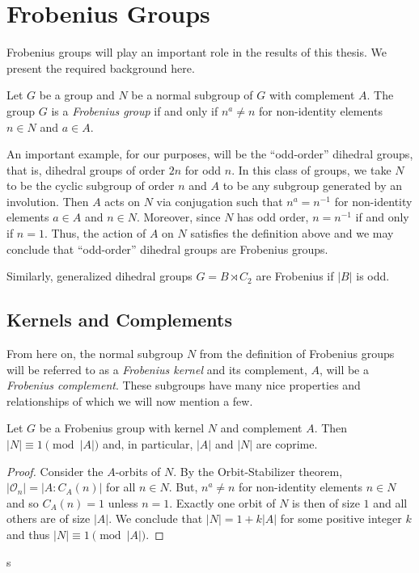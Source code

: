 \documentclass[main.tex]{subfiles}
\begin{document}
\section{Frobenius Groups}

Frobenius groups will play an important role in the results of this thesis. We present the required background here.

\hss

\begin{definition}
Let $G$ be a group and $N$ be a normal subgroup of $G$ with complement $A$. The group $G$ is a \emph{Frobenius group} if and only if $n^a \ne n$ for non-identity elements $n \in N$ and $a \in A$.
\end{definition}

\hss

An important example, for our purposes, will be the ``odd-order'' dihedral groups, that is, dihedral groups of order $2n$ for odd $n$. In this class of groups, we take $N$ to be the cyclic subgroup of order $n$ and $A$ to be any subgroup generated by an involution. Then $A$ acts on $N$ via conjugation such that $n^a = n^{-1}$ for non-identity elements $a \in A$ and $n \in N$. Moreover, since $N$ has odd order, $n = n^{-1}$ if and only if $n = 1$. Thus, the action of $A$ on $N$ satisfies the definition above and we may conclude that ``odd-order'' dihedral groups are Frobenius groups.

Similarly, generalized dihedral groups $G = B \rtimes C_2$ are Frobenius if $|B|$ is odd.

\hss

\subsection{Kernels and Complements}

\hss

From here on, the normal subgroup $N$ from the definition of Frobenius groups will be referred to as a \emph{Frobenius kernel} and its complement, $A$, will be a \emph{Frobenius complement}. These subgroups have many nice properties and relationships of which we will now mention a few.

\begin{lemma}\label{frobeniuscoprime}
Let $G$ be a Frobenius group with kernel $N$ and complement $A$. Then $|N| \equiv 1 \pmod{|A|}$ and, in particular, $|A|$ and $|N|$ are coprime.
\end{lemma}

\begin{proof}
Consider the $A$-orbits of $N$. By the Orbit-Stabilizer theorem, $|\mathcal{O}_n| = |A : C_A(n)|$ for all $n \in N$. But, $n^a \ne n$ for non-identity elements $n \in N$ and so $C_A(n) = 1$ unless $n = 1$. Exactly one orbit of $N$ is then of size $1$ and all others are of size $|A|$. We conclude that $|N| = 1 + k |A|$ for some positive integer $k$ and thus $|N| \equiv 1 \pmod{|A|}$.
\end{proof}s
\end{document}
